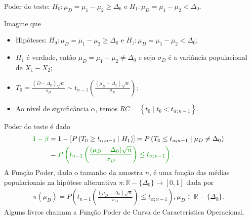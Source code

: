 \documentclass[9pt]{beamer}
\begin{document}
\begin{frame}{Poder do teste: $H_0:\mu_D = \mu_1 - \mu_2 \geq \Delta_0$ e $H_1:\mu_D =  \mu_1 - \mu_2 < \Delta_0$.}

\normalsize

Imagine que
\begin{itemize}
	\item Hipóteses: $H_0:\mu_D= \mu_1 - \mu_2 \geq \Delta_0$ e $H_1:\mu_D= \mu_1 -  \mu_2 < \Delta_0$;
	\item $H_1$ é verdade, então $\mu_D = \mu_1-\mu_2 \neq \Delta_0$ e seja $\sigma_D$ é a variância populacional de $X_1 - X_2$;
	\item $T_0 = \frac{(\bar{D} - \Delta_0)\sqrt{n}}{s_D} \sim t_{n-1}\left( \frac{(\mu_D - \Delta_0)\sqrt{n}}{\sigma_D} \right)$;
	\item Ao nível de significância $\alpha$, temos $RC = \left\{ t_0 \mid t_0 < t_{\alpha;n-1}  \right\}$.
\end{itemize}
\vfill	

Poder do teste é dado
\begin{align*}
\textcolor{important}{1-\beta} &=1 - \left[P\left( T_0 \geq t_{\alpha;n-1}  \mid H_1 \right)\right]=  P\left( T_0 \leq t_{\alpha;n-1} \mid \mu_D \neq \Delta_0 \right) \\ 
&= \textcolor{important}{P\left( t_{n-1}\left( \frac{(\mu_D - \Delta_0)\sqrt{n}}{\sigma_D} \right) \leq t_{\alpha;n-1} \right).}
\end{align*}
A \textcolor{important}{Função Poder}, dado o tamanho da amostra $n$, é uma função das médias populacionais na hipótese alternativa  $\pi: \mathbb{R} -\{\Delta_0\} \longrightarrow [0,1]$ dada por
\begin{align*}
\pi(\mu_D) = P\left( t_{n-1}\left( \frac{(\mu_D - \Delta_0)\sqrt{n}}{\sigma_D} \right) \leq t_{\alpha;n-1} \right),  \mu_D \in \mathbb{R} - \{\Delta_0\}.
\end{align*}
Alguns livros chamam a Função Poder de \textcolor{important}{Curva de Característica Operacional.}

\normalsize

\end{frame}
\end{document}
